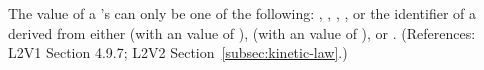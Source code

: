 The value of a \KineticLaw's  can only be one of the
following: , , , ,
or the identifier of a \UnitDefinition derived from either 
(with an  value of ),  (with an
 value of ), or .  (References:
L2V1 Section 4.9.7; L2V2 Section~\ref{subsec:kinetic-law}.)
